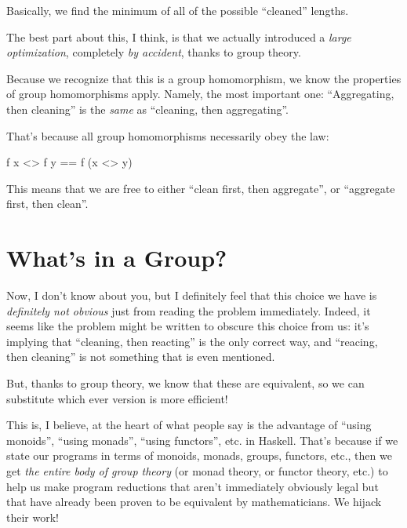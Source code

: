 \documentclass[]{article}
\newenvironment{Shaded}{}{}
\newcommand{\FunctionTok}[1]{\textcolor[rgb]{0.02,0.16,0.49}{#1}}
\newcommand{\NormalTok}[1]{#1}
\begin{document}
Basically, we find the minimum of all of the possible ``cleaned'' lengths.

The best part about this, I think, is that we actually introduced a \emph{large
optimization}, completely \emph{by accident}, thanks to group theory.

Because we recognize that this is a group homomorphism, we know the properties
of group homomorphisms apply. Namely, the most important one: ``Aggregating,
then cleaning'' is the \emph{same} as ``cleaning, then aggregating''.

That's because all group homomorphisms necessarily obey the law:

\begin{Shaded}
\begin{Highlighting}[]
\NormalTok{f x }\FunctionTok{<>}\NormalTok{ f y }\FunctionTok{==}\NormalTok{ f (x }\FunctionTok{<>}\NormalTok{ y)}
\end{Highlighting}
\end{Shaded}

This means that we are free to either ``clean first, then aggregate'', or
``aggregate first, then clean''.

\hypertarget{whats-in-a-group}{%
\section{What's in a Group?}\label{whats-in-a-group}}

Now, I don't know about you, but I definitely feel that this choice we have is
\emph{definitely not obvious} just from reading the problem immediately. Indeed,
it seems like the problem might be written to obscure this choice from us: it's
implying that ``cleaning, then reacting'' is the only correct way, and
``reacing, then cleaning'' is not something that is even mentioned.

But, thanks to group theory, we know that these are equivalent, so we can
substitute which ever version is more efficient!

This is, I believe, at the heart of what people say is the advantage of ``using
monoids'', ``using monads'', ``using functors'', etc. in Haskell. That's because
if we state our programs in terms of monoids, monads, groups, functors, etc.,
then we get \emph{the entire body of group theory} (or monad theory, or functor
theory, etc.) to help us make program reductions that aren't immediately
obviously legal but that have already been proven to be equivalent by
mathematicians. We hijack their work!
\end{document}
